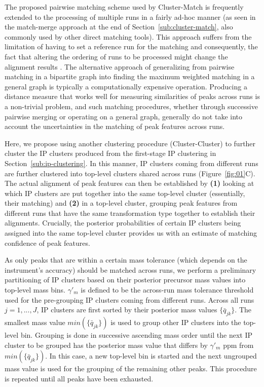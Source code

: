 The proposed pairwise matching scheme used by Cluster-Match is frequently extended to the processing of multiple runs in a fairly ad-hoc manner (as seen in the match-merge approach at the end of Section~\ref{sub:cluster-match}, also commonly used by other direct matching tools). This approach suffers from the limitation of having to set a reference run for the matching and consequently, the fact that altering the ordering of runs to be processed might change the alignment results \cite{Smith2013}. The alternative approach of generalizing from pairwise matching in a bipartite graph into finding the maximum weighted matching in a general graph is typically a computationally expensive operation. Producing a distance measure that works well for measuring similarities of peaks across runs is a non-trivial problem, and such matching procedures, whether through successive pairwise merging or operating on a general graph, generally do not take into account the uncertainties in the matching of peak features across runs.

Here, we propose using another clustering procedure (Cluster-Cluster) to further cluster the IP clusters produced from the first-stage IP clustering in Section~\ref{sub:ip-clustering}. In this manner, IP clusters coming from different runs are further clustered into top-level clusters shared across runs (Figure~\ref{fig:01}C). The actual alignment of peak features can then be established by \textbf{(1)} looking at which IP clusters are put together into the same top-level cluster (essentially, their matching) and \textbf{(2)} in a top-level cluster, grouping peak features from different runs that have the same transformation type together to establish their alignments. Crucially, the posterior probabilities of certain IP clusters being assigned into the same top-level cluster provides us with an estimate of matching confidence of peak features.

As only peaks that are within a certain mass tolerance (which depends on the instrument's accuracy) should be matched across runs, we perform a preliminary partitioning of IP clusters based on their posterior precursor mass values into top-level mass bins. $\gamma'_m$ is defined to be the across-run mass tolerance threshold used for the pre-grouping IP clusters coming from different runs. Across all runs $j=1,...,J$, IP clusters are first sorted by their posterior mass values $\{{\bar{q}}_{jk}\}$. The smallest mass value $min(\{{\bar{q}}_{jk}\})$ is used to group other IP clusters into the top-level bin. Grouping is done in successive ascending mass order until the next IP cluster to be grouped has the posterior mass value that differs by $\gamma'_m$ ppm from $min(\{{\bar{q}}_{jk}\})$. In this case, a new top-level bin is started and the next ungrouped mass value is used for the grouping of the remaining other peaks. This procedure is repeated until all peaks have been exhausted.

